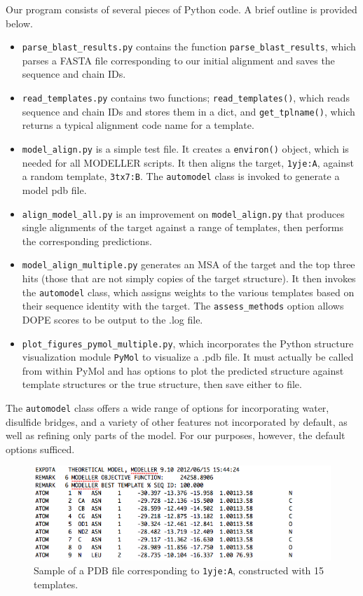 \documentclass[]{report}   %
\begin{document}
Our program consists of several pieces of Python code. A brief outline is provided below.
\begin{itemize}
\item \texttt{parse\_blast\_results.py} contains the function \texttt{parse\_blast\_results}, which parses a FASTA file corresponding to our initial alignment and saves the sequence and chain IDs.
\item \texttt{read\_templates.py} contains two functions; \texttt{read\_templates()}, which reads sequence and chain IDs and stores them in a dict, and \texttt{get\_tplname()}, which returns a typical alignment code name for a template.
\item \texttt{model\_align.py} is a simple test file. It creates a \texttt{environ()} object, which is needed for all MODELLER scripts. It then aligns the target, \texttt{1yje:A}, against a random template, \texttt{3tx7:B}. The \texttt{automodel} class is invoked to generate a model pdb file.
\item \texttt{align\_model\_all.py} is an improvement on \texttt{model\_align.py} that produces single alignments of the target against a range of templates, then performs the corresponding predictions.
\item \texttt{model\_align\_multiple.py} generates an MSA of the target and the top three hits (those that are not simply copies of the target structure). It then invokes the \texttt{automodel} class, which assigns weights to the various templates based on their sequence identity with the target. The \texttt{assess\_methods} option allows DOPE scores to be output to the .log file.
\item \texttt{plot\_figures\_pymol\_multiple.py}, which incorporates the Python structure visualization module \texttt{PyMol} to visualize a .pdb file. It must actually be called from within PyMol and has options to plot the predicted structure against template structures or the true structure, then save either to file.
\end{itemize}

The \texttt{automodel} class offers a wide range of options for incorporating water, disulfide bridges, and a variety of other features not incorporated by default, as well as refining only parts of the model. For our purposes, however, the default options sufficed.

\begin{figure}[h!]
\begin{center}
\includegraphics[scale=0.5]{output-15template.png}
 \caption{Sample of a PDB file corresponding to \texttt{1yje:A}, constructed with 15 templates.}
\end{center}
\end{figure}
\end{document}
